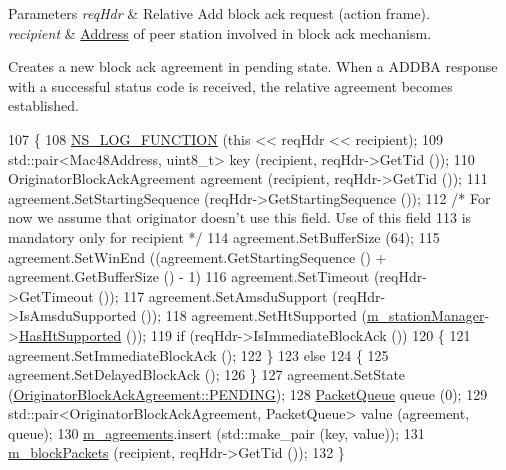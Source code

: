 \begin{DoxyParams}{Parameters}
{\em req\+Hdr} & Relative Add block ack request (action frame). \\
\hline
{\em recipient} & \hyperlink{classns3_1_1Address}{Address} of peer station involved in block ack mechanism.\\
\hline
\end{DoxyParams}
Creates a new block ack agreement in pending state. When a A\+D\+D\+BA response with a successful status code is received, the relative agreement becomes established. 
\begin{DoxyCode}
107 \{
108   \hyperlink{log-macros-disabled_8h_a90b90d5bad1f39cb1b64923ea94c0761}{NS\_LOG\_FUNCTION} (\textcolor{keyword}{this} << reqHdr << recipient);
109   std::pair<Mac48Address, uint8\_t> key (recipient, reqHdr->GetTid ());
110   OriginatorBlockAckAgreement agreement (recipient, reqHdr->GetTid ());
111   agreement.SetStartingSequence (reqHdr->GetStartingSequence ());
112   \textcolor{comment}{/* For now we assume that originator doesn't use this field. Use of this field}
113 \textcolor{comment}{     is mandatory only for recipient */}
114   agreement.SetBufferSize (64);
115   agreement.SetWinEnd ((agreement.GetStartingSequence () + agreement.GetBufferSize () - 1) %
116   agreement.SetTimeout (reqHdr->GetTimeout ());
117   agreement.SetAmsduSupport (reqHdr->IsAmsduSupported ());
118   agreement.SetHtSupported (\hyperlink{classns3_1_1BlockAckManager_afb809abb11edae6179dc2f5b8c1f8ce5}{m\_stationManager}->\hyperlink{classns3_1_1WifiRemoteStationManager_ac792dc8f3c77d507d25de0b87b52608c}{HasHtSupported} ());
119   \textcolor{keywordflow}{if} (reqHdr->IsImmediateBlockAck ())
120     \{
121       agreement.SetImmediateBlockAck ();
122     \}
123   \textcolor{keywordflow}{else}
124     \{
125       agreement.SetDelayedBlockAck ();
126     \}
127   agreement.SetState (\hyperlink{classns3_1_1OriginatorBlockAckAgreement_ab33ae8af8c458aca7437a472778e4761a0f8c3879c3167ef79a0d4c57ac6015ff}{OriginatorBlockAckAgreement::PENDING});
128   \hyperlink{classns3_1_1BlockAckManager_a19b26a2c6037c95267b6f1905feb07a5}{PacketQueue} queue (0);
129   std::pair<OriginatorBlockAckAgreement, PacketQueue> value (agreement, queue);
130   \hyperlink{classns3_1_1BlockAckManager_a952a6b8b29705c83ba6464f7cf7ffe66}{m\_agreements}.insert (std::make\_pair (key, value));
131   \hyperlink{classns3_1_1BlockAckManager_aed8b4d86e877d3e5a2ed869636328867}{m\_blockPackets} (recipient, reqHdr->GetTid ());
132 \}
\end{DoxyCode}


